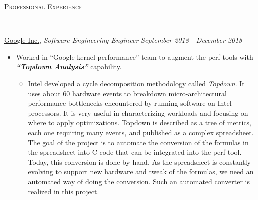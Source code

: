 \documentclass[9pt]{article}
\newenvironment{changemargin}[2]{%
  \begin{list}{}{%
    \setlength{\topsep}{0pt}%
    \setlength{\leftmargin}{#1}%
    \setlength{\rightmargin}{#2}%
    \setlength{\listparindent}{\parindent}%
    \setlength{\itemindent}{\parindent}%
    \setlength{\parsep}{\parskip}%
  }%
  \item[]}{\end{list}
}
\newcommand{\lineover}{
	\begin{changemargin}{-0.05in}{-0.05in}
		\vspace*{-8pt}
		\hrulefill \\
		\vspace*{-2pt}
	\end{changemargin}
}
\newcommand{\header}[1]{
	\begin{changemargin}{-0.5in}{-0.5in}
		\scshape{#1}\\
  	\lineover
	\end{changemargin}
}
\newenvironment{body} {
	\vspace*{-16pt}
	\begin{changemargin}{-0.25in}{-0.5in}
  }	
	{\end{changemargin}
}
\begin{document}
\header{Professional Experience}
\begin{body}
	\vspace{14pt}

        \href{https://www.google.com/intl/en/about/}{Google Inc.}, \emph{Software Engineering Engineer} \hfill \emph{September 2018 - December 2018}\\
	\vspace*{-4pt}
	\begin{itemize} \itemsep -0pt
            	\item  Worked in ``Google kernel performance'' team to augment the perf
			tools with \textbf{\emph{\href{https://ieeexplore.ieee.org/document/6844459}{``Topdown Analysis''}}} capability.
			\begin{itemize}
                                \item Intel developed a cycle decomposition
                                methodology called
                                \emph{\href{https://ieeexplore.ieee.org/document/6844459}{Topdown}}.
                                It uses about 60 hardware events to breakdown
                                micro-architectural performance bottlenecks
                                encountered by running software on Intel
                                processors. It is very useful in characterizing
                                workloads and focusing on where to apply
                                optimizations.  Topdown is described as a tree
                                of metrics, each one requiring many events, and
                                published as a complex spreadsheet. The goal of
                                the project is to automate the conversion of
                                the formulas in the spreadsheet into C code
                                that can be integrated into the perf tool.
                                Today, this conversion is done by hand. As the
                                spreadsheet is constantly evolving to support
                                new hardware and tweak of the formulas, we need an
                                automated way of doing the conversion. Such an
                                automated converter is realized in this
                                project.


\end{itemize}
\end{itemize}
\end{body}
\end{document}

